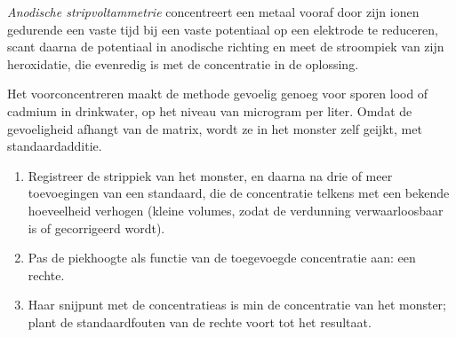 \begin{definition}\label{def:b3:electrode-kinetics:stripping}
\emph{Anodische stripvoltammetrie}
concentreert een metaal vooraf door zijn ionen gedurende een vaste tijd
bij een vaste potentiaal op een elektrode te reduceren, scant daarna de
potentiaal in anodische richting en meet de stroompiek van zijn
heroxidatie, die evenredig is met de concentratie in de oplossing.
\end{definition}

Het voorconcentreren maakt de methode gevoelig genoeg voor sporen lood of
cadmium in drinkwater, op het niveau van microgram per liter. Omdat de
gevoeligheid afhangt van de matrix, wordt ze in het monster zelf geijkt,
met standaardadditie.

\begin{method}\label{met:b3:electrode-kinetics:standard-addition}
\begin{enumerate}
  \item Registreer de strippiek van het monster, en daarna na drie of meer
        toevoegingen van een standaard, die de concentratie telkens met een
        bekende hoeveelheid verhogen (kleine volumes, zodat de verdunning
        verwaarloosbaar is of gecorrigeerd wordt).
  \item Pas de piekhoogte als functie van de toegevoegde concentratie aan:
        een rechte.
  \item Haar snijpunt met de concentratieas is min de concentratie van het
        monster; plant de standaardfouten van de rechte voort tot het
        resultaat.
\end{enumerate}
\end{method}

